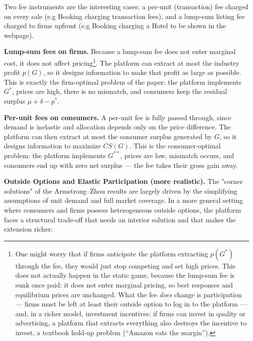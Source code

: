 \documentclass[12pt, a4paper]{article}
\begin{document}
Two fee instruments are the interesting cases: a per-unit (transaction) fee charged on every sale (e.g Booking charging transaction fees), and a lump-sum listing fee charged to firms upfront (e.g Booking charging a Hotel to be shown in the webpage).

\textbf{Lump-sum fees on firms.} Because a lump-sum fee does not enter marginal cost, it does not affect pricing\footnote{One might worry that if firms anticipate the platform extracting $p(G^*)$ through the fee, they would just stop competing and set high prices. This does not actually happen in the static game, because the lump-sum fee is sunk once paid: it does not enter marginal pricing, so best responses and equilibrium prices are unchanged. What the fee \emph{does} change is participation --- firms must be left at least their outside option to log in to the platform --- and, in a richer model, investment incentives: if firms can invest in quality or advertising, a platform that extracts everything also destroys the incentive to invest, a textbook hold-up problem (``Amazon eats the margin'').}. The platform can extract at most the industry profit $p(G)$, so it designs information to make that profit as large as possible. This is exactly the firm-optimal problem of the paper: the platform implements $G^*$, prices are high, there is no mismatch, and consumers keep the residual surplus $\mu + \delta - p^*$.

\textbf{Per-unit fees on consumers.} A per-unit fee is fully passed through, since demand is inelastic and allocation depends only on the price difference. The platform can then extract at most the consumer surplus generated by $G$, so it designs information to maximize $CS(G)$. This is the consumer-optimal problem: the platform implements $G^{**}$, prices are low, mismatch occurs, and consumers end up with zero net surplus --- the fee takes their gross gain away.

\textbf{Outside Options and Elastic Participation (more realistic).}
The "corner solutions" of the Armstrong--Zhou results are largely driven by the simplifying assumptions of unit demand and full market coverage. In a more general setting where consumers and firms possess heterogeneous outside options, the platform faces a structural trade-off that needs an interior solution and that makes the extension richer:
\end{document}
